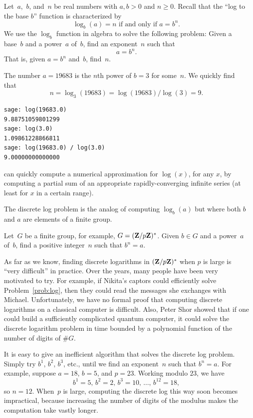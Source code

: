 Let~$a$,~$b$, and~$n$ be real numbers with
$a,b>0$ and $n\geq 0$.
Recall that the ``log to the base $b$'' function is
characterized by
$$
  \log_b(a) = n \text{ if and only if } a=b^n.
$$
We use the $\log_b$ function
in algebra to solve
the following problem:
Given a base~$b$ and a power~$a$ of~$b$,
find an exponent~$n$ such that
$$
   a = b^n.
$$
That is, given $a=b^n$ and~$b$, find~$n$.

\begin{sg}
The number $a = 19683$ is the
$n$th power of $b=3$ for some~$n$. We quickly find
that
$$
  n = \log_3(19683) = \log(19683) / \log(3) = 9.
$$
\begin{verbatim}
sage: log(19683.0)
9.88751059801299
sage: log(3.0)
1.09861228866811
sage: log(19683.0) / log(3.0)
9.00000000000000
\end{verbatim}
\sage can quickly compute a numerical approximation for $\log(x)$, for
any $x$, by computing a partial sum of an appropriate
rapidly-converging infinite series (at least for $x$ in a certain
range).
\end{sg}

The discrete log problem is the analog of computing $\log_b(a)$  but
where both $b$ and $a$ are elements of a finite group.
\begin{problem}\label{prob:log}
Let~$G$ be a finite group, for example, $G=(\mathbf{Z}/p\mathbf{Z}{})^*$.  Given $b\in G$ and
a power~$a$ of~$b$, find a positive integer~$n$ such that
$b^n=a$.
\end{problem}

As far as we know, finding discrete logarithms in $(\mathbf{Z}/p\mathbf{Z}{})^*$
when $p$ is large is
``very difficult'' in practice.  Over the years, many people have been
very motivated to try.  For example, if Nikita's captors could
efficiently solve Problem~\ref{prob:log}, then they could read the
messages she exchanges with Michael.  Unfortunately, we have no formal
proof that computing discrete logarithms on a classical computer is
difficult.   Also, Peter
Shor \cite{shor} showed that if one could build a
sufficiently complicated quantum computer, it
could solve the discrete logarithm problem in time bounded by a
polynomial function of the number of digits of $\#G$.

It is easy to give an inefficient algorithm that solves the discrete
log problem.  Simply try $b^1$, $b^2$, $b^3$, etc., until we find an
exponent~$n$ such that $b^n=a$.  For example, suppose $a = 18$, $b=5$,
and $p=23$.  Working modulo $23$, we have
$$b^1 = 5,\, b^2 = 2,\, b^3 = 10,\, \ldots,\, b^{12} = 18,$$
so $n=12$.
When~$p$ is large, computing the discrete log this way soon becomes
impractical, because increasing the number of digits of the modulus
makes the computation take vastly longer.


